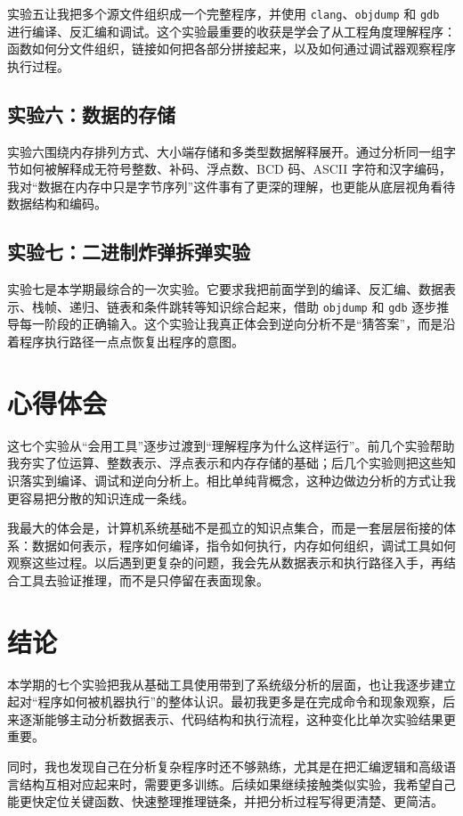 \documentclass[12pt, a4paper]{academics}
\begin{document}
实验五让我把多个源文件组织成一个完整程序，并使用 \texttt{clang}、\texttt{objdump} 和 \texttt{gdb} 进行编译、反汇编和调试。这个实验最重要的收获是学会了从工程角度理解程序：函数如何分文件组织，链接如何把各部分拼接起来，以及如何通过调试器观察程序执行过程。

\subsection{实验六：数据的存储}	

实验六围绕内存排列方式、大小端存储和多类型数据解释展开。通过分析同一组字节如何被解释成无符号整数、补码、浮点数、BCD 码、ASCII 字符和汉字编码，我对“数据在内存中只是字节序列”这件事有了更深的理解，也更能从底层视角看待数据结构和编码。

\subsection{实验七：二进制炸弹拆弹实验}

实验七是本学期最综合的一次实验。它要求我把前面学到的编译、反汇编、数据表示、栈帧、递归、链表和条件跳转等知识综合起来，借助 \texttt{objdump} 和 \texttt{gdb} 逐步推导每一阶段的正确输入。这个实验让我真正体会到逆向分析不是“猜答案”，而是沿着程序执行路径一点点恢复出程序的意图。

\section{心得体会}

这七个实验从“会用工具”逐步过渡到“理解程序为什么这样运行”。前几个实验帮助我夯实了位运算、整数表示、浮点表示和内存存储的基础；后几个实验则把这些知识落实到编译、调试和逆向分析上。相比单纯背概念，这种边做边分析的方式让我更容易把分散的知识连成一条线。

我最大的体会是，计算机系统基础不是孤立的知识点集合，而是一套层层衔接的体系：数据如何表示，程序如何编译，指令如何执行，内存如何组织，调试工具如何观察这些过程。以后遇到更复杂的问题，我会先从数据表示和执行路径入手，再结合工具去验证推理，而不是只停留在表面现象。

\section{结论}

本学期的七个实验把我从基础工具使用带到了系统级分析的层面，也让我逐步建立起对“程序如何被机器执行”的整体认识。最初我更多是在完成命令和现象观察，后来逐渐能够主动分析数据表示、代码结构和执行流程，这种变化比单次实验结果更重要。

同时，我也发现自己在分析复杂程序时还不够熟练，尤其是在把汇编逻辑和高级语言结构互相对应起来时，需要更多训练。后续如果继续接触类似实验，我希望自己能更快定位关键函数、快速整理推理链条，并把分析过程写得更清楚、更简洁。
\end{document}
